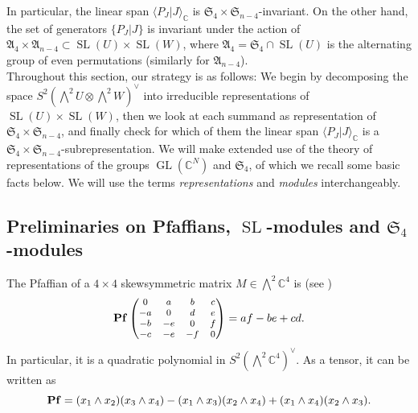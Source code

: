 \documentclass[11pt,reqno]{amsart}
\theoremstyle{definition}
\numberwithin{theorem}{section}
\DeclareMathOperator{\Pf}{\bf Pf}
\DeclareMathOperator{\GL}{GL}
\DeclareMathOperator{\SL}{SL}
\numberwithin{equation}{section}
\begin{document}
\noindent In particular, the linear span $\langle P_J|J\rangle_\mathbb C$ is $\mathfrak{S}_4\times \mathfrak{S}_{n-4}$-invariant. On the other hand, the set of generators $\{P_J|J\}$ is invariant under the action of $\mathfrak{A}_4\times \mathfrak{A}_{n-4}\subset \SL(U)\times \SL(W)$, where $\mathfrak{A}_4=\mathfrak{S}_4\cap \SL(U)$ is the alternating group of even permutations (similarly for $\mathfrak{A}_{n-4}$). \\
\indent Throughout this section, our strategy is as follows: We begin by decomposing the space $S^2(\bigwedge^2U \otimes \bigwedge^2W)^\vee$ into irreducible representations of $\SL(U)\times \SL(W)$, then we look at each summand as representation of $\mathfrak{S}_4\times \mathfrak{S}_{n-4}$, and finally check for which of them the linear span $\langle P_J|J \rangle_{\mathbb C}$ is a $\mathfrak{S}_4\times \mathfrak{S}_{n-4}$-subrepresentation. We will make extended use of the theory of representations of the groups $\GL(\mathbb C^N)$ and $\mathfrak{S}_4$, of which we recall some basic facts below. We will use the terms {\em representations} and {\em modules} interchangeably.

\subsection{Preliminaries on Pfaffians, $\SL$-modules and $\mathfrak{S}_4$-modules}\label{subsec:preliminaries modules}

\indent The Pfaffian of a $4\times 4$ skewsymmetric matrix $M\in \bigwedge^2\mathbb C^4$ is (see \cite[Section 2.7.4]{landsberg2011tensors})
\[ \Pf {\footnotesize \begin{pmatrix} 0 & a & b & c \\ -a & 0 & d & e \\ -b & -e & 0 & f \\ -c & -e & -f & 0 \end{pmatrix}} = af - be + cd .\]
In particular, it is a quadratic polynomial in $S^2(\bigwedge^2\mathbb C^4)^\vee$. As a tensor, it can be written as 
\begin{equation}\label{eq:Pfaffian as tensor} 
    \Pf = (x_1\wedge x_2)(x_3\wedge x_4) - (x_1\wedge x_3)(x_2\wedge x_4) + (x_1\wedge x_4)(x_2\wedge x_3) .
    \end{equation}

\medskip
\end{document}
